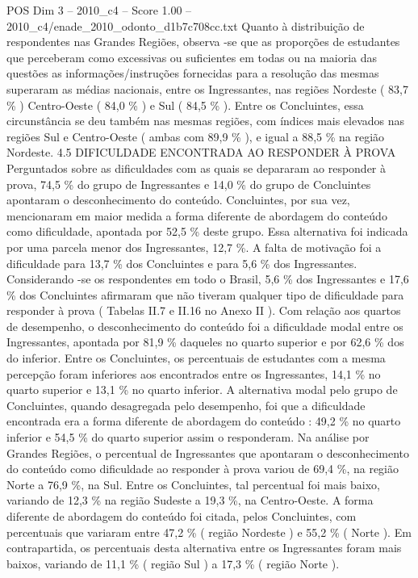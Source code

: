 \begin{textsample}{POS Dim 3 – 2010\_c4 – Score 1.00 – 2010\_c4/enade\_2010\_odonto\_d1b7c708cc.txt}
Quanto à distribuição de respondentes nas Grandes Regiões, observa -se que as proporções de estudantes que perceberam como excessivas ou suficientes em todas ou na maioria das questões as informações/instruções fornecidas para a resolução das mesmas superaram as médias nacionais, entre os Ingressantes, nas regiões Nordeste ( 83,7 \% ) Centro-Oeste ( 84,0 \% ) e Sul ( 84,5 \% ).
Entre os Concluintes, essa circunstância se deu também nas mesmas regiões, com índices mais elevados nas regiões Sul e Centro-Oeste ( ambas com 89,9 \% ), e igual a 88,5 \% na região Nordeste. 4.5 DIFICULDADE ENCONTRADA AO RESPONDER À PROVA Perguntados sobre as dificuldades com as quais se depararam ao responder à prova, 74,5 \% do grupo de Ingressantes e 14,0 \% do grupo de Concluintes apontaram o desconhecimento do conteúdo.
Concluintes, por sua vez, mencionaram em maior medida a forma diferente de abordagem do conteúdo como dificuldade, apontada por 52,5 \% deste grupo.
Essa alternativa foi indicada por uma parcela menor dos Ingressantes, 12,7 \%.
A falta de motivação foi a dificuldade para 13,7 \% dos Concluintes e para 5,6 \% dos Ingressantes.
Considerando -se os respondentes em todo o Brasil, 5,6 \% dos Ingressantes e 17,6 \% dos Concluintes afirmaram que não tiveram qualquer tipo de dificuldade para responder à prova ( Tabelas II.7 e II.16 no Anexo II ).
Com relação aos quartos de desempenho, o desconhecimento do conteúdo foi a dificuldade modal entre os Ingressantes, apontada por 81,9 \% daqueles no quarto superior e por 62,6 \% dos do inferior.
Entre os Concluintes, os percentuais de estudantes com a mesma percepção foram inferiores aos encontrados entre os Ingressantes, 14,1 \% no quarto superior e 13,1 \% no quarto inferior.
A alternativa modal pelo grupo de Concluintes, quando desagregada pelo desempenho, foi que a dificuldade encontrada era a forma diferente de abordagem do conteúdo : 49,2 \% no quarto inferior e 54,5 \% do quarto superior assim o responderam.
Na análise por Grandes Regiões, o percentual de Ingressantes que apontaram o desconhecimento do conteúdo como dificuldade ao responder à prova variou de 69,4 \%, na região Norte a 76,9 \%, na Sul.
Entre os Concluintes, tal percentual foi mais baixo, variando de 12,3 \% na região Sudeste a 19,3 \%, na Centro-Oeste.
A forma diferente de abordagem do conteúdo foi citada, pelos Concluintes, com percentuais que variaram entre 47,2 \% ( região Nordeste ) e 55,2 \% ( Norte ).
Em contrapartida, os percentuais desta alternativa entre os Ingressantes foram mais baixos, variando de 11,1 \% ( região Sul ) a 17,3 \% ( região Norte ).

\end{textsample}
